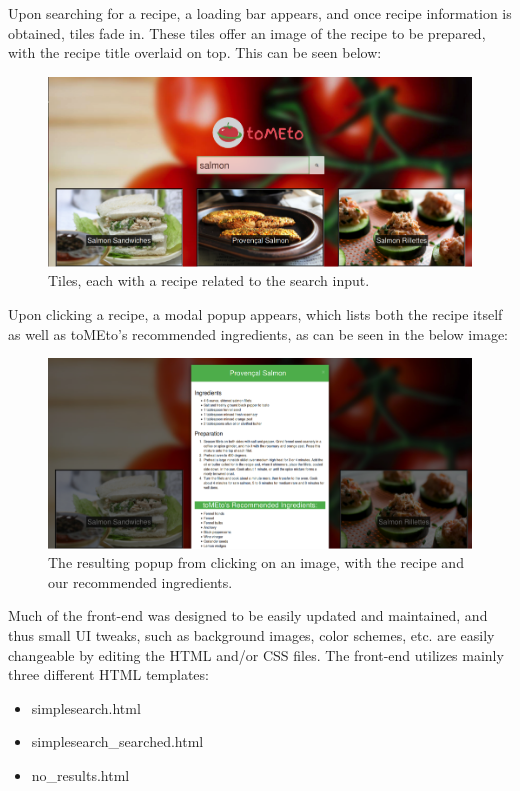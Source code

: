 \documentclass{acm_proc_article-sp}
\begin{document}
Upon searching for a recipe, a loading bar appears, and once recipe information is obtained, tiles fade in. These tiles offer an image of the recipe to be prepared, with the recipe title overlaid on top. This can be seen below:
\begin{figure}[H]
\includegraphics[scale=0.5]{p2.png}
\caption{Tiles, each with a recipe related to the search input.}
\end{figure}
Upon clicking a recipe, a modal popup appears, which lists both the recipe itself as well as toMEto's recommended ingredients, as can be seen in the below image:
\begin{figure}[H]
\includegraphics[scale=0.5]{p3.png}
\caption{The resulting popup from clicking on an image, with the recipe and our recommended ingredients.}
\end{figure}
Much of the front-end was designed to be easily updated and maintained, and thus small UI tweaks, such as background images, color schemes, etc. are easily changeable by editing the HTML and/or CSS files. The front-end utilizes mainly three different HTML templates:
\begin{itemize}
\item simplesearch.html
\item simplesearch\_searched.html 
\item no\_results.html
\end{itemize}
\end{document}
